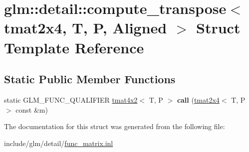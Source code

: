 \hypertarget{structglm_1_1detail_1_1compute__transpose_3_01tmat2x4_00_01T_00_01P_00_01Aligned_01_4}{}\section{glm\+:\+:detail\+:\+:compute\+\_\+transpose$<$ tmat2x4, T, P, Aligned $>$ Struct Template Reference}
\label{structglm_1_1detail_1_1compute__transpose_3_01tmat2x4_00_01T_00_01P_00_01Aligned_01_4}
\subsection*{Static Public Member Functions}
\begin{DoxyCompactItemize}
\item 
\mbox{\label{structglm_1_1detail_1_1compute__transpose_3_01tmat2x4_00_01T_00_01P_00_01Aligned_01_4_af3c109154b85b056e50e42e36bba0371}} 
static G\+L\+M\+\_\+\+F\+U\+N\+C\+\_\+\+Q\+U\+A\+L\+I\+F\+I\+ER \hyperlink{structglm_1_1tmat4x2}{tmat4x2}$<$ T, P $>$ {\bfseries call} (\hyperlink{structglm_1_1tmat2x4}{tmat2x4}$<$ T, P $>$ const \&m)
\end{DoxyCompactItemize}


The documentation for this struct was generated from the following file\+:\begin{DoxyCompactItemize}
\item 
include/glm/detail/\hyperlink{func__matrix_8inl}{func\+\_\+matrix.\+inl}\end{DoxyCompactItemize}
